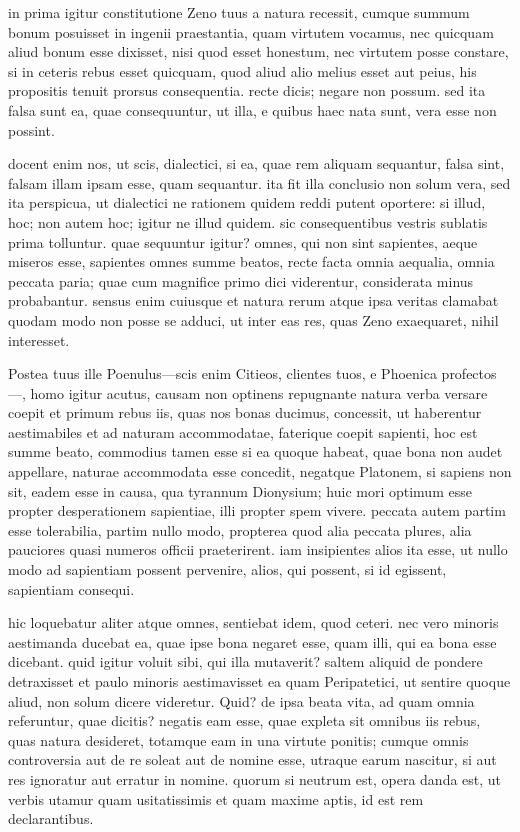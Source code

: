  in prima igitur constitutione Zeno tuus a natura recessit, cumque summum bonum posuisset in ingenii praestantia, quam virtutem vocamus, nec quicquam aliud bonum esse dixisset, nisi quod esset honestum, nec virtutem posse constare, si in ceteris rebus esset quicquam, quod aliud alio melius esset aut peius, his propositis tenuit prorsus consequentia. recte dicis; negare non possum. sed ita falsa sunt ea, quae consequuntur, ut illa, e quibus haec nata sunt, vera esse non possint.

 docent enim nos, ut scis, dialectici, si ea, quae rem aliquam sequantur, falsa sint, falsam illam ipsam esse, quam sequantur. ita fit illa conclusio non solum vera, sed ita perspicua, ut dialectici ne rationem quidem reddi putent oportere: si illud, hoc; non autem hoc; igitur ne illud quidem. sic consequentibus vestris sublatis prima tolluntur. quae sequuntur igitur? omnes, qui non sint sapientes, aeque miseros esse, sapientes omnes summe beatos, recte facta omnia aequalia, omnia peccata paria; quae cum magnifice primo dici viderentur, considerata minus probabantur. sensus enim cuiusque et natura rerum atque ipsa veritas clamabat quodam modo non posse se adduci, ut inter eas res, quas Zeno exaequaret, nihil interesset.

 Postea tuus ille Poenulus—scis enim Citieos, clientes tuos, e Phoenica profectos—, homo igitur acutus, causam non optinens repugnante natura verba versare coepit et primum rebus iis, quas nos bonas ducimus, concessit, ut haberentur aestimabiles et ad naturam accommodatae, faterique coepit sapienti, hoc est summe beato, commodius tamen esse si ea quoque habeat, quae bona non audet appellare, naturae accommodata esse concedit, negatque Platonem, si sapiens non sit, eadem esse in causa, qua tyrannum Dionysium; huic mori optimum esse propter desperationem sapientiae, illi propter spem vivere. peccata autem partim esse tolerabilia, partim nullo modo, propterea quod alia peccata plures, alia pauciores quasi numeros officii praeterirent. iam insipientes alios ita esse, ut nullo modo ad sapientiam possent pervenire, alios, qui possent, si id egissent, sapientiam consequi.

 hic loquebatur aliter atque omnes, sentiebat idem, quod ceteri. nec vero minoris aestimanda ducebat ea, quae ipse bona negaret esse, quam illi, qui ea bona esse dicebant. quid igitur voluit sibi, qui illa mutaverit? saltem aliquid de pondere detraxisset et paulo minoris aestimavisset ea quam Peripatetici, ut sentire quoque aliud, non solum dicere videretur. Quid? de ipsa beata vita, ad quam omnia referuntur, quae dicitis? negatis eam esse, quae expleta sit omnibus iis rebus, quas natura desideret, totamque eam in una virtute ponitis; cumque omnis controversia aut de re soleat aut de nomine esse, utraque earum nascitur, si aut res ignoratur aut erratur in nomine. quorum si neutrum est, opera danda est, ut verbis utamur quam usitatissimis et quam maxime aptis, id est rem declarantibus.

